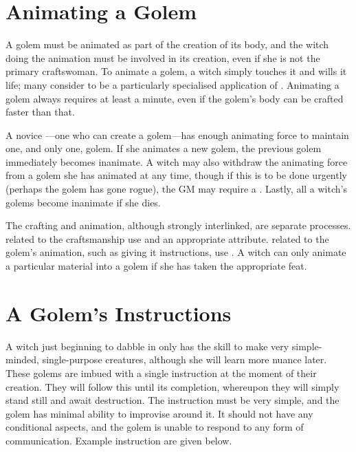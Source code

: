 
\section{Animating a Golem}

A golem must be animated as part of the creation of its body, and the witch doing the animation must be involved in its creation, even if she is not the primary craftswoman.
To animate a golem, a witch simply touches it and wills it life; many consider  to be a particularly specialised application of .
Animating a golem always requires at least a minute, even if the golem's body can be crafted faster than that.

A novice ---one who can create a golem---has enough animating force to maintain one, and only one, golem.
If she animates a new golem, the previous golem immediately becomes inanimate.
A witch may also withdraw the animating force from a golem she has animated at any time, though if this is to be done urgently (perhaps the golem has gone rogue), the GM may require a {\test}.
Lastly, all a witch's golems become inanimate if she dies.

The crafting and animation, although strongly interlinked, are separate processes.
\capital{\tests} related to the craftsmanship use  and an appropriate attribute.
\capital{\tests} related to the golem's animation, such as giving it instructions, use .
A witch can only animate a particular material into a golem if she has taken the appropriate feat.

\section{A Golem's Instructions}

A witch just beginning to dabble in  only has the skill to make very simple-minded, single-purpose creatures, although she will learn more nuance later.
These golems are imbued with a single instruction at the moment of their creation.
They will follow this until its completion, whereupon they will simply stand still and await destruction.
The instruction must be very simple, and the golem has minimal ability to improvise around it.
It should not have any conditional aspects, and the golem is unable to respond to any form of communication.
Example instruction are given below.

